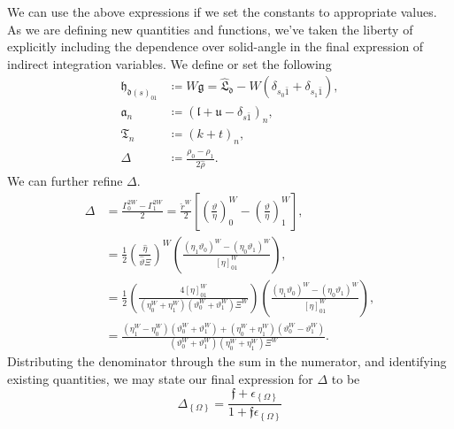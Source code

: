 We can use the above expressions if we set the constants to appropriate values.
As we are defining new quantities and functions, we've taken the liberty of
explicitly including the dependence over solid-angle in the final expression of
indirect integration variables. We define or set the following
\begin{align}
\mathfrak{h}_{\mathfrak{d}\left(s\right)_{01}}
    &\coloneqq
W\mathfrak{g}
    =
    \hat{\mathfrak{L}}_{\mathfrak{d}}
    -W\left(\delta_{s_{0}\bar{1}}+\delta_{s_{1}\bar{1}}\right)
,\\
\mathfrak{a}_{n}
    &\coloneqq
        \left(\mathfrak{l}+\mathfrak{u}-\delta_{s\bar{1}}\right)_{n}
,\\
\mathfrak{T}_{n}
    &\coloneqq
        \left(k+t\right)_{n}
,\\
\Delta
    &\coloneqq
        \frac{\rho_{0}-\rho_{1}}{2\hat{\rho}}
.
\end{align}
We can further refine $\Delta$.
\begin{align}
\Delta
    &=
        \frac{\Gamma_{0}^{2W}-\Gamma_{1}^{2W}}{2}
        =
        \frac{\check{r}^{W}}{2}
        \left[
            \left(\frac{\vartheta}{\eta}\right)_{0}^{W}
                -
            \left(\frac{\vartheta}{\eta}\right)_{1}^{W}
        \right]
,\\
    &=
    \frac{1}{2}
    \left(\frac{\hat{\eta}}{\hat{\vartheta}\Xi}\right)^{W}
    \left(
        \frac
        {
            \left(\eta_{1}\vartheta_{0}\right)^{W}
                -
            \left(\eta_{0}\vartheta_{1}\right)^{W}
        }
        {\left[\eta\right]_{01}^{W}}
    \right)
,\\
&=
    \frac{1}{2}
    \left(
        \frac
        {
            4\left[\eta\right]_{01}^{W}
        }
        {
            \left(\eta_{0}^{W} + \eta_{1}^{W}\right)
            \left( \vartheta_{0}^{W} + \vartheta_{1}^{W} \right)
            \Xi^{W}
        }
    \right)
    \left(
        \frac
        {
            \left(\eta_{1}\vartheta_{0}\right)^{W}
                -
            \left(\eta_{0}\vartheta_{1}\right)^{W}
        }
        {
            \left[\eta\right]_{01}^{W}
        }
    \right)
,\\
&=
    \frac
    {
        \left( \eta_{1}^{W} - \eta_{0}^{W} \right)
        \left( \vartheta_{0}^{W} + \vartheta_{1}^{W} \right)
            +
        \left( \eta_{0}^{W} + \eta_{1}^{W} \right)
        \left( \vartheta_{0}^{W} - \vartheta_{1}^{W} \right)
    }
    {
        \left( \vartheta_{0}^{W} + \vartheta_{1}^{W} \right)
        \left(\eta_{0}^{W} + \eta_{1}^{W}\right)
        \Xi^{W}
    }
.
\end{align}
Distributing the denominator through the sum in the numerator, and identifying
existing quantities, we may state our final expression for $\Delta$ to be
\begin{equation}
\Delta_{\left\{\Omega\right\}}
    =
        \frac
        {\mathfrak{f}+\epsilon_{\left\{\Omega\right\}}}
        {1+\mathfrak{f}\epsilon_{\left\{\Omega\right\}}}
\end{equation}

